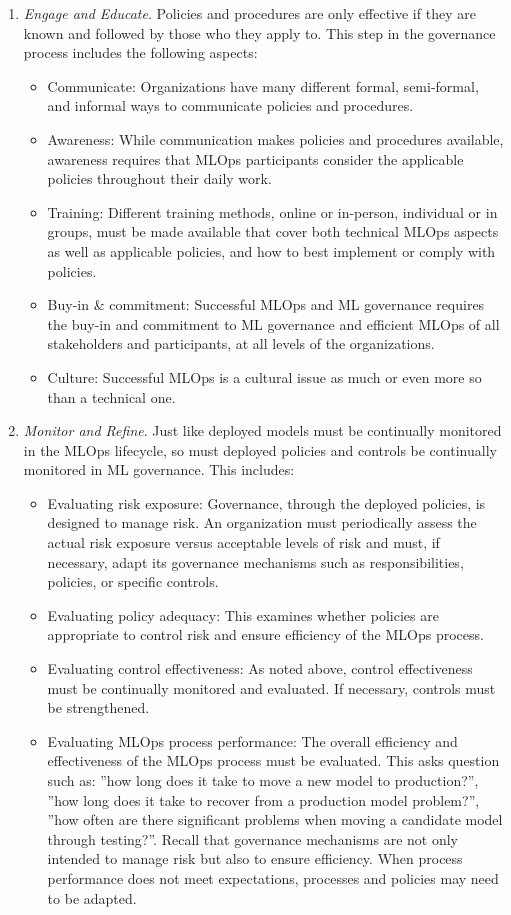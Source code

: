 \begin{enumerate}
\item \emph{Engage and Educate}. Policies and procedures are only effective if they are known and followed by those who they apply to. This step in the governance process includes the following aspects:
\begin{itemize}
   \item Communicate: Organizations have many different formal, semi-formal, and informal ways to communicate policies and procedures.
   \item Awareness: While communication makes policies and procedures available, awareness requires that MLOps participants consider the applicable policies throughout their daily work. 
   \item Training: Different training methods, online or in-person, individual or in groups, must be made available that cover both technical MLOps aspects as well as applicable policies, and how to best implement or comply with policies.
   \item Buy-in \& commitment: Successful MLOps and ML governance requires the buy-in and commitment to ML governance and efficient MLOps of all stakeholders and participants, at all levels of the organizations. 
   \item Culture: Successful MLOps is a cultural issue as much or even more so than a technical one. 
\end{itemize}

\item \emph{Monitor and Refine}. Just like deployed models must be continually monitored in the MLOps lifecycle, so must deployed policies and controls be continually monitored in ML governance. This includes:
\begin{itemize}
   \item Evaluating risk exposure: Governance, through the deployed policies, is designed to manage risk. An organization must periodically assess the actual risk exposure versus acceptable levels of risk and must, if necessary, adapt its governance mechanisms such as responsibilities, policies, or specific controls. 
   \item Evaluating policy adequacy: This examines whether policies are appropriate to control risk and ensure efficiency of the MLOps process.
   \item Evaluating control effectiveness: As noted above, control effectiveness must be continually monitored and evaluated. If necessary, controls must be strengthened. 
   \item Evaluating MLOps process performance: The overall efficiency and effectiveness of the MLOps process must be evaluated. This asks question such as: ''how long does it take to move a new model to production?'', ''how long does it take to recover from a production model problem?'', ''how often are there significant problems when moving a candidate model through testing?''. Recall that governance mechanisms are not only intended to manage risk but also to ensure efficiency. When process performance does not meet expectations, processes and policies may need to be adapted.
\end{itemize}
\end{enumerate}

